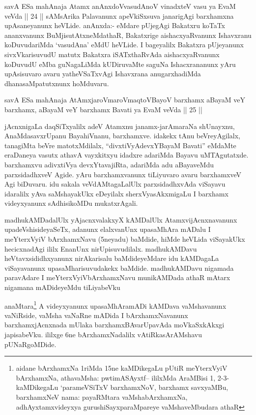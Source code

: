 \begin{artha}
savA ESa mahAnaja Atamx anAnxdoVvasudAnoV vinadxteV vasu ya EvaM veVda || 24 || sAMsArika Palavanunx apeVkiSxsuva janarigAgi barxhamxna upAsaneyanunx heVLide. anAnxda:- eMdare pUjegAgi Bakatxru koTaTx ananxvanunx BuMjisutAtxneMdathaR, Bakatxrige aishacxyaRvanunx Ishavxranu koDuvudariMda `vasudAna' eMdU heVLide. I bageyalilx Bakatxra pUjeyanunx sivxVkarisuvudU matutx Bakatxra iSATxthaRvAda aishacxyaRvanunx koDuvudU eMba guNagaLiMda kUDiruvaMte saguNa Ishacxrananunx yAru upAsisuvaro avaru yatheVSaTxvAgi Ishavxrana anugarxhadiMda dhanasaMpatutxnunx hoMduvaru. 

savA ESa mahAnaja AtAmx\s jaroV\s maroV\s maqtoV\s BayoV barxhamx aBayaM veY barxhamx, aBayaM veY barxhamx Bavati ya EvaM veVda || 25 ||
\end{artha}


\begin{artha}
jAcnxnigaLa daqSiTxyalilx adeV Atamxnu janamx-jarAmaraNa shUnayxnu, AnaMdasavxrUpanu BayahiVnanu, barxhamxve. idakekx tAnu beVreyAgilalx, tanagiMta beVre matotxMdilalx, ``divxtiVyAdevxYBayaM Bavati''  eMdaMte eraDaneya vasutx athavA vayxkitxyu idadxre adariMda Bayavu uMTAgutatxde. barxhamxvu adivxtiVya devxYtavajiRta, adariMda adu aBayaveMdu parxsidadhxveV Agide. yAru barxhamxvanunx tiLiyuvaro avaru barxhamxveV Agi biDuvaru. idu sakala veVdAMtagaLalUlx parxsidadhxvAda viSayavu idaralilx yAva saMshayakUkx eDeyilalx sherxVyasAkxmigaLu I barxhamx videyxyanunx sAdhisikoMDu mukatxrAgali.
\end{artha}



\begin{artha}
madhukAMDadalUlx yAjacnxvalakxyX kAMDalUlx AtamxvijAcnxnavanunx upadeVshisideyaSeTx, adanunx elalxvanUnx upasaMhAra mADalu I meYterxVyiV bArxhamxNavu (5neyadu) baMdide, hiMde heVLida viSayakUkx hecicxnadAgi ililx EnanUnx nirUpisuvudilalx. madhukAMDavu heVtavxsididhxyanunx nirAkarisalu baMdideyeMdare idu kAMDagaLa viSayavanunx upasaMharisuvudakekx baMdide. madhukAMDavu nigamada paravAdare I meYterxVyiVbArxhamxNavu munikAMDada athaR mAtarx nigamana mADideyeMdu tiLiyabeVku
\end{artha}

\begin{artha}
anaMtara\footnote{aidane bArxhamxNa 1riMda 15ne kaMDikegaLu pUtiR meYterxVyiV bArxhamxNa, athavaMsha: pwtimASAyxtf{\rm --} ililxMda AraMBisi 1, 2-3- kaMDikegaLu `parameVSiTxV barxhamxNoV, barxhamx savxyaMBu, barxhamxNeV nama: payaRMtara vaMshabArxhamxNa, adhAyxtamxvideyxya gurushiSayxparaMpareye vaMshaveMbudara athaR} A videyxyanunx upasaMhAramADi kAMDava vaMshavanunx vaNiRside, vaMsha vaNaRne mADida I bArxhamxNavanunx barxhamxjAcnxnada mUlaka barxhamxBAvarUpavAda moVkaSxkAkxgi japisabeVku. ililxge 6ne bArxhamxNadalilx vAtiRkasArAMshavu pUNaRgoMDide.
\end{artha}

